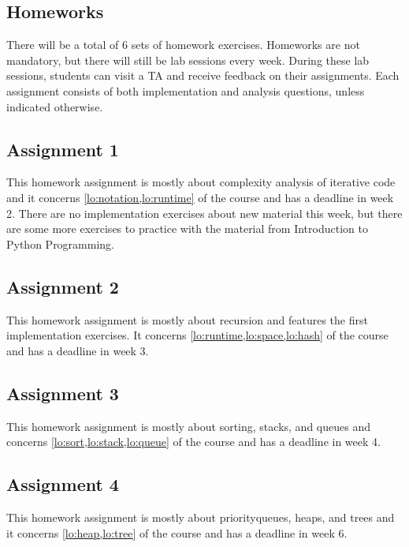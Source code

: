 \subsection{Homeworks}
\label{sub:homeworks}

There will be a total of 6 sets of homework exercises. Homeworks are not mandatory, but there will still be lab sessions
every week. During these lab sessions, students can visit a TA and receive feedback on their assignments. Each
assignment consists of both implementation and analysis questions, unless indicated otherwise.

\subsection*{Assignment 1}
\label{sub:assignment_1}

This homework assignment is mostly about complexity analysis of iterative code and it concerns
\cref{lo:notation,lo:runtime} of the course and has a deadline in week 2. There are no implementation exercises about
new material this week, but there are some more exercises to practice with the material from Introduction to Python
Programming.

\subsection*{Assignment 2}
\label{sub:assignment_2}

This homework assignment is mostly about recursion and features the first implementation exercises. It concerns
\cref{lo:runtime,lo:space,lo:hash} of the course and has a deadline in week 3.

\subsection*{Assignment 3}
\label{sub:assignment_3}

This homework assignment is mostly about sorting, stacks, and queues and concerns \cref{lo:sort,lo:stack,lo:queue} of the
course and has a deadline in week 4.

\subsection*{Assignment 4}
\label{sub:assignment_4}

This homework assignment is mostly about priorityqueues, heaps, and trees and it concerns \cref{lo:heap,lo:tree} of
the course and has a deadline in week 6.


